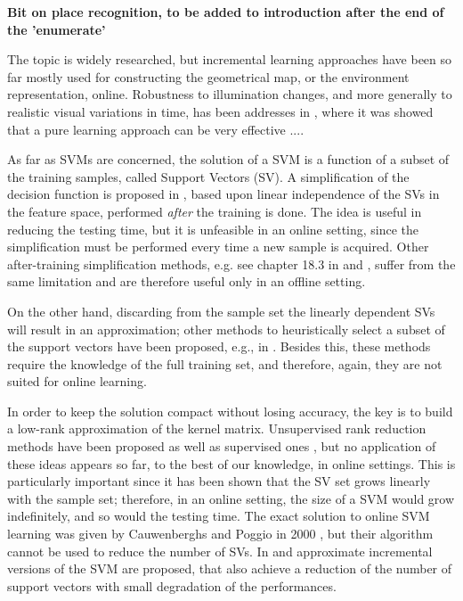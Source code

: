 \bf{Bit on place recognition, to be added to introduction after the end of the 'enumerate'}


The topic is  widely researched, but
incremental learning approaches have been so far mostly used for constructing the
geometrical map, or the environment representation, online\cite{emma:irca05, ljubjiana:icra02}.
Robustness to illumination changes, and more generally to realistic
visual variations in time, has been addresses in \cite{pronobis:iros06}, where it was showed that
a pure learning approach can be very effective ....


As far as SVMs are concerned, the solution of a SVM is a function of
a subset of the training samples, called Support Vectors (SV). A
simplification of the decision function is proposed in
\cite{DownsGM01}, based upon linear independence of the SVs in the
feature space, performed \emph{after} the training is done. 
The idea is useful in reducing the testing
time, but it is unfeasible in an online setting, since the
simplification must be performed every time a new sample is
acquired. Other after-training simplification methods, e.g. see
chapter 18.3 in \cite{SmolaS02} and \cite{nguyen2005}, suffer
from the same limitation and are therefore useful only in an offline
setting.

On the other hand, discarding from the sample set the linearly
dependent SVs will result in an approximation; other methods to
heuristically select a subset of the support vectors have been
proposed, e.g., in \cite{LeeM01,schoel06,KeerthiCDC06}. Besides this,
these methods require the knowledge of the full training set, and
therefore, again, they are not suited for online learning.

In order to keep the solution compact without losing accuracy, the key
is to build a low-rank approximation of the kernel
matrix. Unsupervised rank reduction methods have been proposed
\cite{Baudat03} as well as supervised ones \cite{BachJordan2005}, but
no application of these ideas appears so far, to the best of our
knowledge, in online settings. This is particularly important since it
has been shown \cite{Steinwart03} that the SV set grows linearly with
the sample set; therefore, in an online setting, the size of a SVM
would grow indefinitely, and so would the testing time. The exact
solution to online SVM learning was given by Cauwenberghs and Poggio
in 2000 \cite{CauwenberghsP00}, but their algorithm cannot be used to
reduce the number of SVs. In \cite{syed99incremental} and
\cite{pronobis:icvs06} approximate incremental
versions of the SVM are proposed, that also achieve a reduction of the
number of support vectors with small degradation of the performances.
